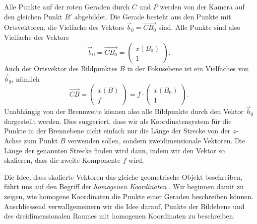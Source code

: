 Alle Punkte auf der roten Geraden durch $C$ und $P$ werden von der Kamera
auf den gleichen Punkt $B'$ abgebildet.
Die Gerade besteht aus den Punkte mit Ortsvektoren, die Vielfache des
Vektors $\vec{b}_0=\overrightarrow{CB_0}$ sind.
Alle Punkte sind also Vielfache des Vektors 
\[
\vec{b}_0
=
\overrightarrow{CB_0}
=
\begin{pmatrix}x(B_0)\\1\end{pmatrix}.
\]
Auch der Ortsvektor des Bildpunktes $B$ in der Fokusebene ist ein Vielfaches 
von $\vec{b}_0$, nämlich
\[
\overrightarrow{CB}
=
\begin{pmatrix}x(B)\\f\end{pmatrix}
=
f \cdot
\begin{pmatrix}x(B_0)\\1\end{pmatrix}.
\]
Unabhängig von der Brennweite können also alle Bildpunkte durch 
den Vektor $\vec{b}_0$ dargestellt werden.
Dies suggeriert, dass wir als Koordinatensystem für die Punkte in der
Brennebene nicht einfach nur die Länge der Strecke von der $z$-Achse 
zum Punkt $B$ verwenden sollen, sondern zweidimensionale Vektoren.
Die Länge der genannten Strecke finden wird dann, indem wir den Vektor
so skalieren, dass die zweite Komponente $f$ wird.

Die Idee, dass skalierte Vektoren das gleiche geometrische Objekt
beschreiben, führt uns auf den Begriff der {\em homogenen Koordinaten}%
%
.
Wir beginnen damit zu zeigen, wie homogene Koordinaten die Punkte
einer Geraden beschreiben können.
Anschliessend verwallgemeinern wir die Idee darauf, Punkte der Bildebene
und des dreidimensionalen Raumes mit homogenen Koordinaten zu beschreiben.

